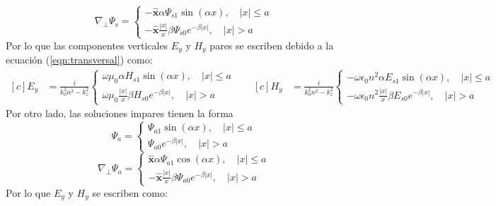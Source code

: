 \begin{equation*}
	\nabla_\perp \Psi_s = \left\{\begin{matrix}
	-\hat{\textbf{x}}\alpha\Psi_{s1}\sin(\alpha x),\quad |x|\le a
	\\
	-\hat{\textbf{x}}\frac{|x|}{x}\beta\Psi_{s0}e^{-\beta|x|}, \quad |x|>a
	\end{matrix}\right.
\end{equation*}
Por lo que las componentes verticales $E_y$ y $H_y$ pares se escriben debido a la ecuación (\ref{eqn:transversal}) como:
\begin{equation*}
	\begin{aligned}[c]
	 E_y &= \frac{i}{k_0^2n^2-k_z^2} \left\{\begin{matrix}
	 \omega\mu_0\alpha H_{s1}\sin(\alpha x),	 \quad |x|\le a
	 \\
	 \omega\mu_0\frac{|x|}{x}\beta H_{s0}e^{-\beta|x|},\quad |x|>a
	 \end{matrix}\right.
\end{aligned} 
\quad
	\begin{aligned}[c]
	 H_y &= \frac{i}{k_0^2n^2-k_z^2} \left\{\begin{matrix}
	 -\omega \epsilon_0 n^2\alpha E_{s1}\sin(\alpha x),	 \quad |x|\le a
	 \\
	 -\omega \epsilon_0 n^2\frac{|x|}{x}\beta E_{s0}e^{-\beta|x|},\quad |x|>a
	 \end{matrix}\right.
\end{aligned} 
\end{equation*}
Por otro lado, las soluciones impares tienen la forma
\begin{equation*}
	\Psi_a = \left\{\begin{matrix}
	\Psi_{a1}\sin(\alpha x),\quad |x|\le a
	\\
	\Psi_{a0}e^{-\beta|x|}, \quad |x|>a
	\end{matrix}\right.
\end{equation*}
\begin{equation*}
	\nabla_\perp \Psi_a = \left\{\begin{matrix}
	\hat{\textbf{x}}\alpha\Psi_{a1}\cos(\alpha x),\quad |x|\le a
	\\
	-\hat{\textbf{x}}\frac{|x|}{x}\beta\Psi_{a0}e^{-\beta|x|}, \quad |x|>a
	\end{matrix}\right.
\end{equation*}
Por lo que $E_y$ y $H_y$ se escriben como:
